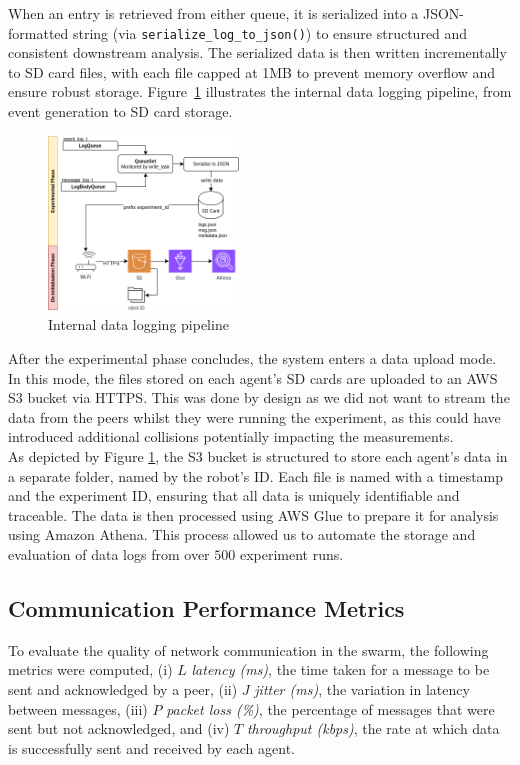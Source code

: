 \documentclass[conference]{IEEEtran}
\begin{document}
When an entry is retrieved from either queue, it is serialized into a JSON-formatted string (via \texttt{serialize\_log\_to\_json()}) to ensure structured and consistent downstream analysis. The serialized data is then written incrementally to SD card files, with each file capped at 1MB to prevent memory overflow and ensure robust storage. Figure~\ref{fig:data-store} illustrates the internal data logging pipeline, from event generation to SD card storage.

\begin{figure}[H]
    \centering
    \includegraphics[width=0.45\textwidth]{data_store.png}
    \caption{Internal data logging pipeline}
    \label{fig:data-store}
\end{figure}

After the experimental phase concludes, the system enters a data upload mode. In this mode, the files stored on each agent's SD cards are uploaded to an AWS S3 bucket via HTTPS. This was done by design as we did not want to stream the data from the peers whilst they were running the experiment, as this could have introduced additional collisions potentially impacting the measurements.\\

As depicted by Figure \ref{fig:data-store}, the S3 bucket is structured to store each agent's data in a separate folder, named by the robot's ID. Each file is named with a timestamp and the experiment ID, ensuring that all data is uniquely identifiable and traceable. The data is then processed using AWS Glue to prepare it for analysis using Amazon Athena. This process allowed us to automate the storage and evaluation of data logs from over $500$ experiment runs.

\subsection{Communication Performance Metrics}

To evaluate the quality of network communication in the swarm, the following metrics were computed, (i) $L$ \emph{latency (ms)}, the time taken for a message to be sent and acknowledged by a peer, (ii) $J$ \emph{jitter (ms)}, the variation in latency between messages, (iii) $P$ \emph{packet loss (\%)}, the percentage of messages that were sent but not acknowledged, and (iv) $T$ \emph{throughput (kbps)}, the rate at which data is successfully sent and received by each agent.
\end{document}
